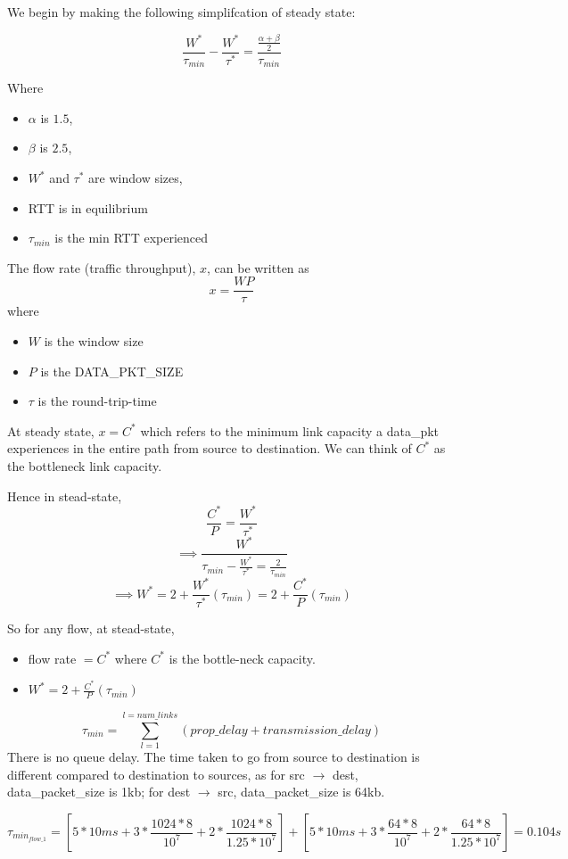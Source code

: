 \documentclass[12pt]{article}
\begin{document}
We begin by making the following simplifcation of steady state:

$$ \frac{W^*}{\tau_{min}} - \frac{W^*}{\tau^*} = \frac{\frac{\alpha + \beta}{2}}{\tau_{min}} $$

Where 
\begin{itemize}
\item $\alpha$ is $1.5$,
\item $\beta$ is $2.5$,
\item $W^*$ and $\tau^*$ are window sizes,
\item RTT is in equilibrium
\item $\tau_{min}$ is the min RTT experienced
\end{itemize}

The flow rate (traffic throughput), $x$, can be written as $$x=\frac{WP}{\tau}$$ where
\begin{itemize}
\item $W$ is the window size
\item $P$ is the DATA\_PKT\_SIZE
\item $\tau$ is the round-trip-time
\end{itemize}

At steady state, $x=C^*$ which refers to the minimum link capacity a data\_pkt experiences in the entire path from source to destination. We can think of $C^*$ as the bottleneck link capacity.

Hence in stead-state, $$\frac{C^*}{P} = \frac{W^*}{\tau^*} $$
$$\implies \frac{W^*}{\tau_{min} - \frac{W^*}{\tau^*} = \frac{2}{\tau_{min}}}$$
$$\implies W^* = 2 + \frac{W^*}{\tau^*}(\tau_{min}) = 2 + \frac{C^*}{P}(\tau_{min}) $$

So for any flow, at stead-state, 
\begin{itemize}
\item flow rate $= C^*$ where $C^*$ is the bottle-neck capacity.
\item $W^*=2 + \frac{C^*}{P}(\tau_{min})$
\end{itemize}


$$\tau_{min}=\sum_{l=1}^{l=num\_links} (prop\_delay + transmission\_delay)$$
There is no queue delay. The time taken to go from source to destination is different compared to destination to sources, as for src $\rightarrow$ dest, data\_packet\_size is 1kb; for dest $\rightarrow$ src, data\_packet\_size is 64kb.


$$\tau_{min_{flow\_1}} = [5*10 ms + 3*\frac{1024*8}{10^7} + 2*\frac{1024*8}{1.25*10^7}] + [5*10 ms + 3*\frac{64*8}{10^7} + 2*\frac{64*8}{1.25*10^7}] = 0.104 s$$ 
\end{document}
